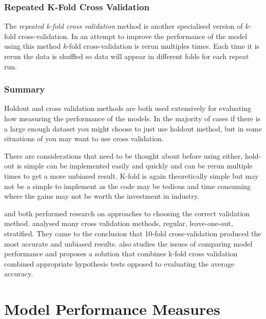 \subsubsection{Repeated K-Fold Cross Validation}
The \textit{repeated k-fold cross validation} method is another specialised version of $k$-fold cross-validation. In an attempt to improve the performance of the model using this method $k$-fold cross-validation is rerun multiples times. Each time it is rerun the data is shuffled so data will appear in different folds for each repeat run. 

\subsubsection{Summary}

Holdout and cross validation methods are both used extensively for evaluating how measuring the performance of the models. In the majority of cases if there is a large enough dataset you might choose to just use holdout method, but in some situations of you may want to use cross validation.

There are considerations that need to be thought about before using either, hold-out is simple can be implemented easily and quickly and can be rerun multiple times to get a more unbiased result. K-fold is again theoretically simple but may not be a simple to implement as the code may be tedious and time consuming where the gains may not be worth the investment in industry. 

\citep{kohavi_study_1995} and \citep{salzberg_comparing_1997} both performed research on approaches to choosing the correct validation method. \cite{kohavi_study_1995} analysed many cross validation methods, regular, leave-one-out, stratified. They came to the conclusion that 10-fold cross-validation produced the most accurate and unbiased results. \cite{salzberg_comparing_1997} also studies the issues of comparing model performance and proposes a solution that combines k-fold cross validation combined appropriate hypothesis tests opposed to evaluating the average accuracy.   



\section{Model Performance Measures}\label{modelPerformMeasure}


